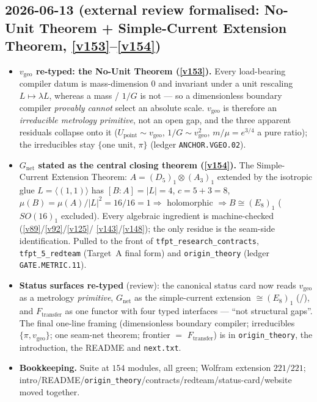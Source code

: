 \subsection*{2026-06-13 (external review formalised: No-Unit Theorem + Simple-Current Extension Theorem, \vref{v153}--\vref{v154})}
\begin{itemize}
\item \textbf{$v_{\mathrm{geo}}$ re-typed: the No-Unit Theorem (\vref{v153}).} Every load-bearing
  compiler datum is mass-dimension $0$ and invariant under a unit rescaling $L\mapsto\lambda L$,
  whereas a mass / $1/G$ is not --- so a dimensionless boundary compiler \emph{provably cannot}
  select an absolute scale. $v_{\mathrm{geo}}$ is therefore an \emph{irreducible metrology
  primitive}, not an open gap, and the three apparent residuals collapse onto it
  ($U_{\mathrm{point}}\sim v_{\mathrm{geo}}$, $1/G\sim v_{\mathrm{geo}}^2$, $m/\mu=e^{3/4}$ a pure
  ratio); the irreducibles stay $\{$one unit, $\pi\}$ (ledger \texttt{ANCHOR.VGEO.02}).
\item \textbf{$G_{\mathrm{net}}$ stated as the central closing theorem (\vref{v154}).} The Simple-Current
  Extension Theorem: $A{=}(D_5)_1{\otimes}(A_3)_1$ extended by the isotropic glue
  $L{=}\langle(1,1)\rangle$ has $[B{:}A]{=}|L|{=}4$, $c{=}5{+}3{=}8$,
  $\mu(B){=}\mu(A)/|L|^2{=}16/16{=}1\Rightarrow$ holomorphic $\Rightarrow B\cong(E_8)_1$ ($SO(16)_1$
  excluded). Every algebraic ingredient is machine-checked (\vref{v89}/\vref{v92}/\vref{v125}/%
  \vref{v143}/\vref{v148}); the only residue is the seam-side identification. Pulled to the front of
  \texttt{tfpt\_research\_contracts}, \texttt{tfpt\_5\_redteam} (Target~A final form) and
  \texttt{origin\_theory} (ledger \texttt{GATE.METRIC.11}).
\item \textbf{Status surfaces re-typed} (review): the canonical status card now reads
  $v_{\mathrm{geo}}$ as a metrology \emph{primitive}, $G_{\mathrm{net}}$ as the simple-current
  extension $\cong(E_8)_1$ (\mE/\mC), and $F_{\mathrm{transfer}}$ as one functor with four typed
  interfaces --- ``not structural gaps''. The final one-line framing (dimensionless boundary compiler;
  irreducibles $\{\pi, v_{\mathrm{geo}}\}$; one seam-net theorem; frontier $=$ $F_{\mathrm{transfer}}$)
  is in \texttt{origin\_theory}, the introduction, the README and \texttt{next.txt}.
\item \textbf{Bookkeeping.} Suite at $154$ modules, all green; Wolfram extension $221/221$;
  intro/README/\texttt{origin\_theory}/contracts/redteam/status-card/website moved together.
\end{itemize}

